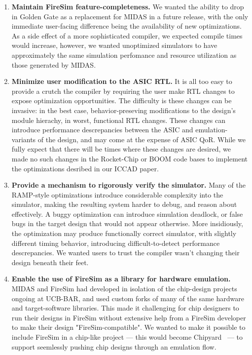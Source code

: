\begin{enumerate}
\item \textbf{Maintain FireSim feature-completeness.} We wanted the ability to
drop in Golden Gate as a replacement for MIDAS in a future release, with the
only immediate user-facing difference being the availability of new
optimizations.  As a side effect of a more sophisticated compiler, we expected
compile times would increase, however, we wanted unoptimized simulators to have
approximately the same simulation perfomance and resource utilization as those generated by MIDAS.

\item \textbf{Minimize user modification to the ASIC RTL.} It is all too easy to
provide a crutch the compiler by requiring the user make RTL changes to expose optimization opportunities. The difficulty is these changes can be
invasive: in the best case, behavior-preseving modifications to the design's
module hierachy, in worst, functional RTL changes. These changes can introduce
performance descrepancies between the ASIC and emulation-variants of the
design, and may come at the expense of ASIC QoR. While we fully expect that
there will be times where these changes are desired, we made no such
changes in the Rocket-Chip or BOOM code bases to implement the optimizations
desribed in our ICCAD paper.


\item \textbf{Provide a mechanism to rigorously verify the simulator.} Many of
the RAMP-style optimizations introduce considerable complexity into the
simulator, making the resulting system harder to debug, and reason about
effectively. A buggy optimization can introduce simulation deadlock, or false
bugs in the target design that would not appear otherwise. More insidiously,
the optimization may produce functionally correct simulator, with slightly
different timing behavior, introducing difficult-to-detect performance
descrepancies. We wanted users to trust the compiler wasn't changing their
design beneath their feet.

\item \textbf{Enable the use of FireSim as a library for hardware emulation.}
MIDAS and FireSim had developed in isolation of the chip-design projects
ongoing at UCB-BAR, and used custom forks of many of the same hardware and
target-software libraries. This made it challenging for chip designers to run
their designs in FireSim without extensive help from a FireSim developer to make their design "FireSim-compatible". We
wanted to make it possible to include FireSim in a chip-like project --- this
would become Chipyard~\cite{Chipyard} --- to support seemlessly pushing chip
designs through an emulation flow.
\end{enumerate}

